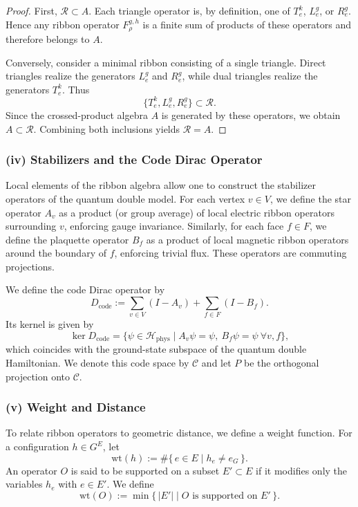 \documentclass[12pt]{article}
\theoremstyle{definition} %
\theoremstyle{plain} %
\theoremstyle{remark} %
\theoremstyle{underline}
\begin{document}
\begin{proof}
First, $\mathcal R\subset A$.
Each triangle operator is, by definition, one of $T_e^k$, $L_e^g$, or $R_e^g$.
Hence any ribbon operator $F_\rho^{g,h}$ is a finite sum of products of these operators and therefore belongs to $A$.

Conversely, consider a minimal ribbon consisting of a single triangle.
Direct triangles realize the generators $L_e^g$ and $R_e^g$, while dual triangles realize the generators $T_e^k$.
Thus
\[
    \{T_e^k, L_e^g, R_e^g\} \subset \mathcal R.
\]
Since the crossed-product algebra $A$ is generated by these operators, we obtain $A\subset\mathcal R$.
Combining both inclusions yields $\mathcal R=A$.
\end{proof}

\subsubsection*{(iv) Stabilizers and the Code Dirac Operator}

Local elements of the ribbon algebra allow one to construct the stabilizer operators of the quantum double model.
For each vertex $v\in V$, we define the star operator $A_v$ as a product (or group average) of local electric ribbon operators surrounding $v$, enforcing gauge invariance.
Similarly, for each face $f\in F$, we define the plaquette operator $B_f$ as a product of local magnetic ribbon operators around the boundary of $f$, enforcing trivial flux. These operators are commuting projections.

We define the code Dirac operator by
\[
    D_{\mathrm{code}}
    := \sum_{v\in V}(I-A_v) + \sum_{f\in F}(I-B_f).
\]
Its kernel is given by
\[
    \ker D_{\mathrm{code}}
    =
    \{\psi\in\mathcal H_{\mathrm{phys}}
    \mid A_v\psi=\psi,\ B_f\psi=\psi\ \forall v,f\},
\]
which coincides with the ground-state subspace of the quantum double Hamiltonian.
We denote this code space by $\mathcal C$ and let $P$ be the orthogonal projection
onto $\mathcal C$.

\subsubsection*{(v) Weight and Distance}

To relate ribbon operators to geometric distance, we define a weight function.
For a configuration $h\in G^{E}$, let
\[
    \mathrm{wt}(h)
    := \#\{\,e\in E \mid h_e \neq e_G\,\}.
\]
An operator $O$ is said to be supported on a subset $E'\subset E$ if it modifies only the variables $h_e$ with $e\in E'$.
We define
\[
    \mathrm{wt}(O)
    := \min\{\,|E'| \mid O \text{ is supported on } E'\,\}.
\]
\end{document}
